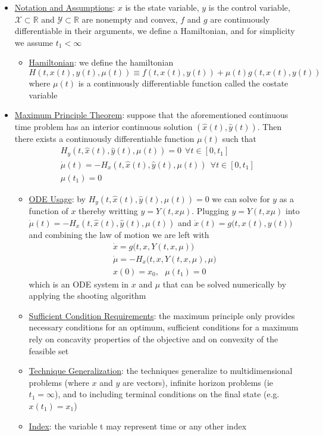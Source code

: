 \documentclass{article}
\begin{document}
\begin{itemize}
    \item \underline{Notation and Assumptions}: $x$ is the state variable, $y$ is the control variable, $\mathcal{X} \subset \mathbb{R}$  and $\mathcal{Y} \subset \mathbb{R}$ are nonempty and convex, $f$ and $g$ are continuously differentiable in their arguments, we define a Hamiltonian, and for simplicity we assume $t_{1} < \infty$
    \begin{itemize}
        \item  \underline{Hamiltonian}: we define the hamiltonian $$H(t,x(t),y(t),\mu(t)) \equiv f(t,x(t),y(t)) + \mu(t)g(t,x(t),y(t))$$ where $\mu(t)$ is a continuously differentiable function called the costate variable
    \end{itemize}
    \item  \underline{Maximum Principle Theorem}: suppose that the aforementioned continuous time problem has an interior continuous solution $(\widehat{x}(t), \widehat{y}(t))$. Then there exists a continuously differentiable function $\mu(t)$ such that
    \begin{gather*} H_{y}(t,\widehat{x}(t), \widehat{y}(t), \mu(t)) = 0 \ \ \forall t \in [0, t_{1}] \\ \dot{\mu}(t) = -H_{x}(t, \widehat{x}(t), \widehat{y}(t), \mu(t)) \ \ \forall t \in [0, t_{1}] \\ \mu(t_{1}) = 0 \end{gather*}
    \begin{itemize}
        \item \underline{ODE Usage}: by $H_{y}(t,\widehat{x}(t), \widehat{y}(t), \mu(t)) = 0$ we can solve for $y$ as a function of $x$ thereby writting $y = Y(t, x \mu)$. Plugging $y = Y(t, x \mu)$ into $\dot{\mu}(t) = -H_{x}(t, \widehat{x}(t), \widehat{y}(t), \mu(t))$ and $ \dot{x}(t) = g\big(t, x(t), y(t)\big)$ and combining the law of motion we are left with
        \begin{gather*} \dot{x} = g\big(t, x, Y(t,x,\mu)\big) \\ \dot{\mu} = -H_{x}\big(t,x,Y(t,x,\mu),\mu \big) \\ x(0) = x_{0}, \ \ \ \mu(t_{1}) = 0 \end{gather*}
        which is an ODE system in $x$ and $\mu$ that can be solved numerically by applying the shooting algorithm
        \item \underline{Sufficient Condition Requirements}: the maximum principle only provides necessary conditions for an optimum, sufficient conditions for a maximum rely on concavity properties of the objective and on convexity of the feasible set
        \item \underline{Technique Generalization}: the techniques generalize to multidimensional problems (where $x$ and $y$ are vectors), infinite horizon problems (ie $t_{1} = \infty$), and to including terminal conditions on the final state (e.g. $x(t_{1}) = x_{1}$)
        \item \underline{Index}: the variable t may represent time or any other index
    \end{itemize}
\end{itemize}
\end{document}
